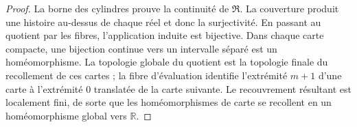 \begin{proof}
La borne des cylindres prouve la continuité de \(\mathfrak R\). La couverture
produit une histoire au-dessus de chaque réel et donc la surjectivité. En passant
au quotient par les fibres, l'application induite est bijective. Dans chaque
carte compacte, une bijection continue vers un intervalle séparé est un
homéomorphisme. La topologie globale du quotient est la topologie finale du
recollement de ces cartes ; la fibre d'évaluation identifie l'extrémité
\(m+1\) d'une carte à l'extrémité \(0\) translatée de la carte suivante.
Le recouvrement résultant est localement fini, de sorte que les
homéomorphismes de carte se recollent en un homéomorphisme global vers
\(\mathbb R\).
\end{proof}

